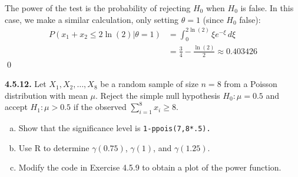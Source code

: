\documentclass{book}
\theoremstyle{definition}
\newcommand{\nn}{\nonumber}
\newcommand{\f}[2]{\frac{#1}{#2}}
\begin{document}
The power of the test is the probability of rejecting $H_0$ when $H_0$ is false. In this case, we make a similar calculation, only setting $\theta = 1$ (since $H_0$ false):
\begin{align}
P(x_1+x_2 \leq 2\ln(2)\vert \theta = 1) &= \int^{2\ln(2)}_0 \xi e^{-\xi}\,d\xi \nn\\
&= \f{3}{4} - \f{\ln(2)}{2} \approx \boxed{0.403426}
\end{align}\qed














\newpage
\noindent\textbf{4.5.12.} Let $X_1, X_2,\dots,X_8$ be a random sample of size $n = 8$ from a Poisson
distribution with mean $\mu$. Reject the simple null hypothesis $H_0 : \mu = 0.5$ and
accept $H_1 : \mu > 0.5$ if the observed $\sum^8_{i=1} x_i \geq 8.$
\begin{enumerate}[(a)]
	\item Show that the significance level is \texttt{1-ppois(7,8*.5).}
	\item Use R to determine $\gamma(0.75)$, $\gamma(1)$, and $\gamma(1.25)$.
	\item Modify the code in Exercise 4.5.9 to obtain a plot of the power function.
\end{enumerate}
\end{document}
